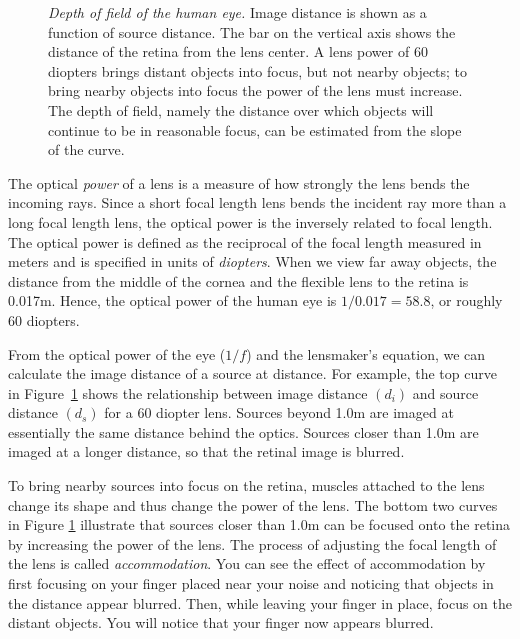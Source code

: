 \begin{figure}
\centerline{
}
\caption[Depth of Field in the Human Eye]{
{\em Depth of field of the human eye.}
Image distance is shown as a function of source distance.
The bar on the vertical axis shows the distance of
the retina from the lens center.
A lens power of 60 diopters brings distant objects into focus,
but not nearby objects;
to bring nearby objects into focus
the power of the lens must increase.
The depth of field, namely the distance
over which objects will continue to be in reasonable focus,
can be estimated from the slope of the curve.
}
\label{f1:accommodation}
\end{figure}
The optical {\em power} of a lens is a measure
of how strongly the lens bends the incoming rays.
Since a short focal length lens bends the incident ray more than
a long focal length lens, the
optical power is the inversely related to focal length.
The optical power is defined as the reciprocal of the focal
length measured in meters and
is specified in units of {\em diopters}.
When we view far away objects,
the distance from the middle of the
cornea and the flexible lens to the retina is 0.017m.
Hence, the optical power of the human eye is $1/0.017 = 58.8$,
or roughly 60 diopters.

From the optical power of the eye ($1/f$) and
the lensmaker's equation, we can calculate
the image distance of a source at distance.
For example, the top curve in Figure~\ref{f1:accommodation} shows the
relationship between image distance $(d_i)$
and source distance $(d_s)$ for a 60 diopter lens.
Sources beyond 1.0m
are imaged at essentially the same distance behind the optics.
Sources closer than 1.0m are imaged at a longer
distance, so that the retinal image is blurred.

To bring nearby sources into focus on the retina,
muscles attached to the
lens change its shape and thus change the power of the lens.
The bottom two curves in Figure \ref{f1:accommodation} illustrate
that sources closer than 1.0m can be focused onto the retina
by increasing the power of the lens.
The process of adjusting the focal length of the lens
is called {\em accommodation}.
You can see the effect of accommodation by first focusing on your
finger placed near your noise and noticing that objects
in the distance appear blurred.
Then, while leaving your finger in place,
focus on the distant objects.
You will notice that your finger now appears blurred.

